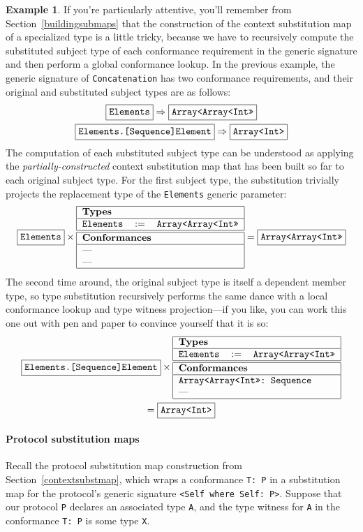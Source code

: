 \documentclass[a4paper,headsepline,bibliography=totoc,toc=flat,fleqn,twoside=semi]{scrbook}
\theoremstyle{definition}
\theoremstyle{definition}
\newtheorem{example}{Example}[chapter]
\theoremstyle{definition}
\newcommand{\ttbox}[1]{\boxed{\mbox{\vphantom{pI\texttt{pI}}\texttt{#1}}}}
\newcommand{\SubMapC}[2]{\begin{tabular}{|lll|}
\hline
\multicolumn{3}{|l|}{\textbf{Types}}\\
\hline
#1\\
\hline
\hline
\multicolumn{3}{|l|}{\textbf{Conformances}}\\
\hline
#2\\
\hline
\end{tabular}}
\newcommand{\SubType}[2]{\texttt{#1}&$:=$&\texttt{#2}}
\newcommand{\SubConf}[1]{\multicolumn{3}{|l|}{\texttt{#1}}}
\begin{document}
\begin{example}
If you're particularly attentive, you'll remember from Section~\ref{buildingsubmaps} that the construction of the context substitution map of a specialized type is a little tricky, because we have to recursively compute the substituted subject type of each conformance requirement in the generic signature and then perform a global conformance lookup. In the previous example, the generic signature of \texttt{Concatenation} has two conformance requirements, and their original and substituted subject types are as follows:
\begin{gather*}
\ttbox{Elements} \Rightarrow \ttbox{Array<Array<Int>>}\\
\ttbox{Elements.[Sequence]Element} \Rightarrow \ttbox{Array<Int>}
\end{gather*}
The computation of each substituted subject type can be understood as applying the \emph{partially-constructed} context substitution map that has been built so far to each original subject type.
\eject
For the first subject type, the substitution trivially projects the replacement type of the \texttt{Elements} generic parameter:
\[
\ttbox{Elements} \times \SubMapC{
\SubType{Elements}{Array<Array<Int>>}
}{
\multicolumn{3}{|l|}{---}\\
\multicolumn{3}{|l|}{---}
} = \ttbox{Array<Array<Int>>}
\]
The second time around, the original subject type is itself a dependent member type, so type substitution recursively performs the same dance with a local conformance lookup and type witness projection---if you like, you can work this one out with pen and paper to convince yourself that it is so:
\begin{multline*}
\ttbox{Elements.[Sequence]Element} \times \SubMapC{
\SubType{Elements}{Array<Array<Int>>}
}{
\SubConf{Array<Array<Int>>:\ Sequence}\\
\multicolumn{3}{|l|}{---}
}\\
= \ttbox{Array<Int>}
\end{multline*}
\end{example}

\paragraph{Protocol substitution maps} Recall the protocol substitution map construction from Section~\ref{contextsubstmap}, which wraps a conformance \texttt{T:\ P} in a substitution map for the protocol's generic signature \verb|<Self where Self: P>|. Suppose that our protocol \texttt{P} declares an associated type \texttt{A}, and the type witness for \texttt{A} in the conformance \verb|T: P| is some type \texttt{X}.
\end{document}
